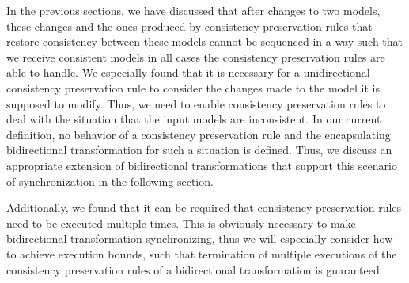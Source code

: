 In the previous sections, we have discussed that after changes to two models, these changes and the ones produced by consistency preservation rules that restore consistency between these models cannot be sequenced in a way such that we receive consistent models in all cases the consistency preservation rules are able to handle.
We especially found that it is necessary for a unidirectional consistency preservation rule to consider the changes made to the model it is supposed to modify.
Thus, we need to enable consistency preservation rules to deal with the situation that the input models are inconsistent.
In our current definition, no behavior of a consistency preservation rule and the encapsulating bidirectional transformation for such a situation is defined.
Thus, we discuss an appropriate extension of bidirectional transformations that support this scenario of synchronization in the following section.

Additionally, we found that it can be required that consistency preservation rules need to be executed multiple times.
This is obviously necessary to make bidirectional transformation synchronizing, thus we will especially consider how to achieve execution bounds, such that termination of multiple executions of the consistency preservation rules of a bidirectional transformation is guaranteed.








